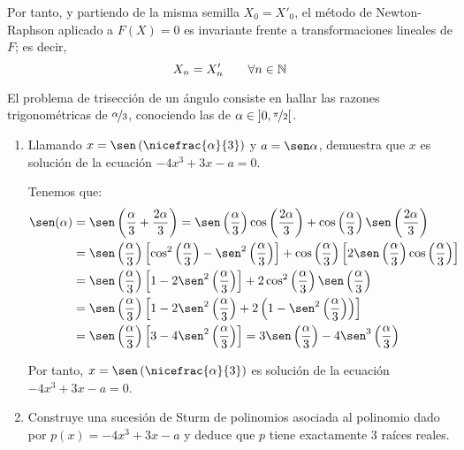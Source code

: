 \begin{ejercicio}
\begin{enumerate}
        Por tanto, y partiendo de la misma semilla $X_0=X'_0$, el método de Newton-Raphson aplicado a $F(X) = 0$ es invariante frente a transformaciones lineales de $F$; es decir,
        \begin{equation*}
            X_n = X'_n\qquad \forall n\in \mathbb{N}
        \end{equation*}
    \end{enumerate}
\end{ejercicio}

\begin{ejercicio}
    El problema de trisección de un ángulo consiste en hallar las razones trigonométricas de $\nicefrac{\alpha}{3}$, conociendo las de $\alpha \in \left]0,\nicefrac{\pi}{2}\right[$.
    \begin{enumerate}
        \item Llamando $x = \sen\left(\nicefrac{\alpha}{3}\right)$ y $a = \sen \alpha$, demuestra que $x$ es solución de la ecuación $-4x^3 + 3x - a = 0$.
        
        Tenemos que:
        \begin{align*}
            \sen(\alpha)
            &= \sen\left(\dfrac{\alpha}{3}+\dfrac{2\alpha}{3}\right)=\sen\left(\dfrac{\alpha}{3}\right)\cos\left(\dfrac{2\alpha}{3}\right)+\cos\left(\dfrac{\alpha}{3}\right)\sen\left(\dfrac{2\alpha}{3}\right)\\
            &= \sen\left(\dfrac{\alpha}{3}\right)\left[\cos^2\left(\dfrac{\alpha}{3}\right)-\sen^2\left(\dfrac{\alpha}{3}\right)\right]+\cos\left(\dfrac{\alpha}{3}\right)\left[2\sen\left(\dfrac{\alpha}{3}\right)\cos\left(\dfrac{\alpha}{3}\right)\right]\\
            &= \sen\left(\dfrac{\alpha}{3}\right)\left[1-2\sen^2\left(\dfrac{\alpha}{3}\right)\right]+2\cos^2\left(\dfrac{\alpha}{3}\right)\sen\left(\dfrac{\alpha}{3}\right)\\
            &= \sen\left(\dfrac{\alpha}{3}\right)\left[1-2\sen^2\left(\dfrac{\alpha}{3}\right)+2\left(1-\sen^2\left(\dfrac{\alpha}{3}\right)\right)\right]\\
            &= \sen\left(\dfrac{\alpha}{3}\right)\left[3-4\sen^2\left(\dfrac{\alpha}{3}\right)\right]
            = 3\sen\left(\dfrac{\alpha}{3}\right)-4\sen^3\left(\dfrac{\alpha}{3}\right)
        \end{align*}

        Por tanto, $x=\sen\left(\nicefrac{\alpha}{3}\right)$ es solución de la ecuación $-4x^3 + 3x - a = 0$.

        \item Construye una sucesión de Sturm de polinomios asociada al polinomio dado por $p(x) = -4x^3 + 3x - a$ y deduce que $p$ tiene exactamente 3 raíces reales.\\
        

\end{enumerate}
\end{ejercicio}
